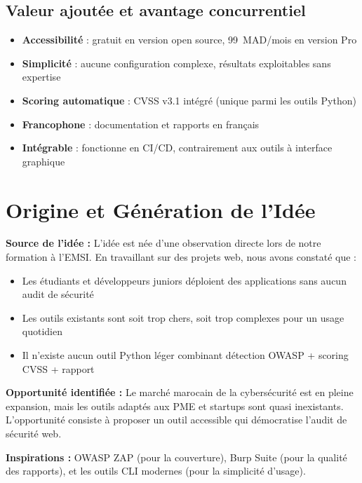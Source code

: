 \documentclass[12pt,a4paper]{report}
\begin{document}
\subsection{Valeur ajoutée et avantage concurrentiel}

\begin{itemize}
  \item \textbf{Accessibilité} : gratuit en version open source, 99~MAD/mois en version Pro
  \item \textbf{Simplicité} : aucune configuration complexe, résultats exploitables sans expertise
  \item \textbf{Scoring automatique} : CVSS v3.1 intégré (unique parmi les outils Python)
  \item \textbf{Francophone} : documentation et rapports en français
  \item \textbf{Intégrable} : fonctionne en CI/CD, contrairement aux outils à interface graphique
\end{itemize}

\section{Origine et Génération de l'Idée}

\textbf{Source de l'idée :} L'idée est née d'une observation directe lors de notre formation à l'EMSI. En travaillant sur des projets web, nous avons constaté que :

\begin{itemize}
  \item Les étudiants et développeurs juniors déploient des applications sans aucun audit de sécurité
  \item Les outils existants sont soit trop chers, soit trop complexes pour un usage quotidien
  \item Il n'existe aucun outil Python léger combinant détection OWASP + scoring CVSS + rapport
\end{itemize}

\textbf{Opportunité identifiée :} Le marché marocain de la cybersécurité est en pleine expansion, mais les outils adaptés aux PME et startups sont quasi inexistants. L'opportunité consiste à proposer un outil accessible qui démocratise l'audit de sécurité web.

\textbf{Inspirations :} OWASP ZAP (pour la couverture), Burp Suite (pour la qualité des rapports), et les outils CLI modernes (pour la simplicité d'usage).
\end{document}
